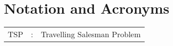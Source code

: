 \chapter*{Notation and Acronyms}

\begin{tabular}{lcl}
TSP                 &:     & Travelling Salesman Problem\\
\end{tabular}

